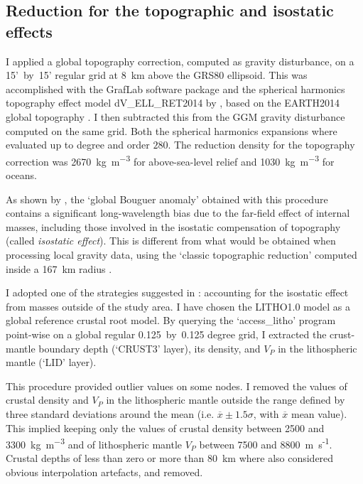 \subsection{Reduction for the topographic and isostatic effects}
\label{ss:Appl:GravTopoIso}
I applied a global topography correction, computed as gravity disturbance, on a 15'~by~15' regular grid at 8~\si{\kilo \metre} above the GRS80 ellipsoid.
This was accomplished with the GrafLab software package \parencites{bucha2013GrafLab} and the spherical harmonics topography effect model {dV\_ELL\_RET2014} by \textcite{Rexer2016}, based on the {EARTH2014} global topography \parencite{Hirt2015}.
I then subtracted this from the GGM gravity disturbance computed on the same grid.
Both the spherical harmonics expansions where evaluated up to degree and order $280$.
The reduction density for the topography correction was 2670~\si{\kilo \gram \per \cubic \metre} for above-sea-level relief and 1030~\si{\kilo \gram \per \cubic \metre} for oceans.

As shown by \textcite{Szwillus2016}, the `global Bouguer anomaly' obtained with this procedure contains a significant long-wavelength bias due to the far-field effect of internal masses, including those involved in the isostatic compensation of topography (called \textit{isostatic effect}).
This is different from what would be obtained when processing local gravity data, using the `classic topographic reduction' computed inside a 167~\si{\kilo \metre} radius \parencite{hayford1912}.

I adopted one of the strategies suggested in \textcite{Szwillus2016}: accounting for the isostatic effect from masses outside of the study area.
I have chosen the {LITHO1.0} model \parencite{Pasyanos2014} as a global reference crustal root model.
By querying the `{access\_litho}' program point-wise on a global regular {0.125}~by~{0.125} degree grid, I extracted the crust-mantle boundary depth (`CRUST3' layer), its density, and $V_P$ in the lithospheric mantle (`LID' layer).

This procedure provided outlier values on some nodes.
I removed the values of crustal density and $V_P$ in the lithospheric mantle outside the range defined by three standard deviations around the mean (i.e. $\overline{x} \pm 1.5 \sigma $, with $\overline{x}$ mean value).
This implied keeping only the values of crustal density between 2500 and 3300~\si{\kilo \gram \per \cubic \metre} and of lithospheric mantle $V_P$ between 7500 and 8800~{m~s\textsuperscript{-1}}.
Crustal depths of less than zero or more than 80~\si{\kilo \metre} where also considered obvious interpolation artefacts, and removed.

